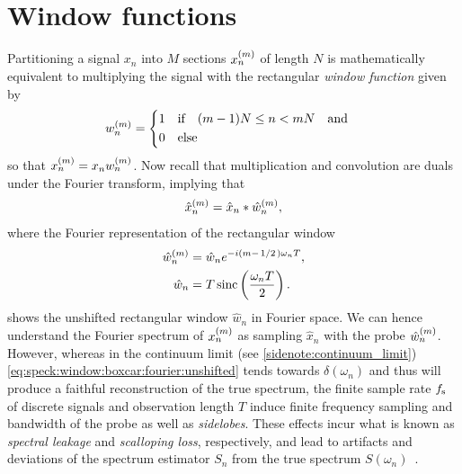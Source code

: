 \section{Window functions}\label{sec:speck:theory:windows}
Partitioning a signal $x_n$ into $M$ sections $x_n^{(m)}$ of length $N$ is mathematically equivalent to multiplying the signal with the rectangular \emph{window function} given by
\begin{align}\label{eq:speck:window:boxcar}
    w_n\gth{m} =
    \begin{dcases}
        1 &\qif* (m - 1) N \leq n < m N\qand \\
        0 &\qelse*
    \end{dcases}
\end{align}
so that $x_n^{(m)} = x_n w_n^{(m)}$.
Now recall that multiplication and convolution are duals under the Fourier transform, implying that
\begin{align}\label{eq:speck:window:ft_pairs}
    \hat{x}_n^{(m)} = \hat{x}_n \ast \hat{w}_n^{(m)},
\end{align}
where the Fourier representation of the rectangular window
\begin{align}
    \hat{w}_n\gth{m} &= \hat{w}_n \e^{-\i(m - \flatfrac{1}{2})\omega_n T}, \label{eq:speck:window:boxcar:fourier}\\
             \hat{w}_n &= T\sinc\left(\frac{\omega_n T}{2}\right). \label{eq:speck:window:boxcar:fourier:unshifted}
\end{align}
 shows the unshifted rectangular window $\hat{w}_n$ in Fourier space.
We can hence understand the Fourier spectrum of $x_n^{(m)}$ as sampling $\hat{x}_n$ with the probe $\hat{w}_n^{(m)}$.
However, whereas in the continuum limit (see \cref{sidenote:continuum_limit}) \cref{eq:speck:window:boxcar:fourier:unshifted} tends towards $\delta(\omega_n)$ and thus will produce a faithful reconstruction of the true spectrum, the finite sample rate $f_{\mathrm{s}}$ of discrete signals and observation length $T$ induce finite frequency sampling and bandwidth of the probe as well as \emph{sidelobes}.
These effects incur what is known as \emph{spectral leakage} and \emph{scalloping loss}, respectively, and lead to artifacts and deviations of the spectrum estimator $S_n$ from the true spectrum $S(\omega_n)$~\cite{Harris1978,Koopmans1995}.

